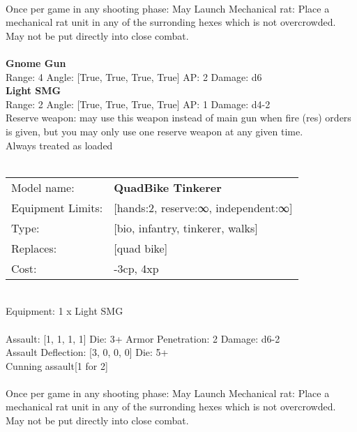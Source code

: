 \ \\
Once per game in any shooting phase: May Launch Mechanical rat: Place a mechanical rat unit in any of the surronding hexes which is not overcrowded. May not be put directly into close combat. \\ 

\ \\
{\bf Gnome Gun } \\



Range: 4  Angle: [True, True, True, True] AP: 2 Damage: d6 \\




{\bf Light SMG } \\



Range: 2  Angle: [True, True, True, True] AP: 1 Damage: d4-2 \\
Reserve weapon: may use this weapon instead of main gun when fire (res) orders is given, but you may only use one reserve weapon at any given time.\\ 
Always treated as loaded\\ 




 
\ \\

\noindent
\begin{tabular}{ll}
Model name: &{\bf QuadBike Tinkerer } \\
Equipment Limits: &[hands:2, reserve:∞, independent:∞] \\
Type: &[bio, infantry, tinkerer, walks] \\
Replaces: &[quad bike] \\
Cost: & -3cp, 4xp\\
\end{tabular}
\ \\
Equipment: 1 x Light SMG \\
\ \\
Assault: [1, 1, 1, 1] Die: 3+ Armor Penetration: 2 Damage: d6-2 \\
Assault Deflection: [3, 0, 0, 0] Die: 5+\\
\indent Cunning assault[1 for 2]\\ 
 
\ \\
Once per game in any shooting phase: May Launch Mechanical rat: Place a mechanical rat unit in any of the surronding hexes which is not overcrowded. May not be put directly into close combat. \\ 

